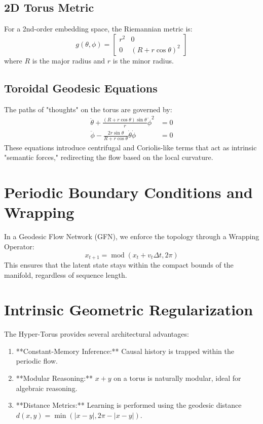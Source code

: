 \documentclass[11pt,a4paper]{report}
\begin{document}
\subsection{2D Torus Metric}
For a 2nd-order embedding space, the Riemannian metric is:
\begin{equation}
    g(\theta, \phi) = \begin{bmatrix} r^2 & 0 \\ 0 & (R + r\cos\theta)^2 \end{bmatrix}
\end{equation}
where $R$ is the major radius and $r$ is the minor radius.

\subsection{Toroidal Geodesic Equations}
The paths of "thoughts" on the torus are governed by:
\begin{align}
    \ddot{\theta} + \frac{(R+r\cos\theta)\sin\theta}{r} \dot{\phi}^2 &= 0 \\
    \ddot{\phi} - \frac{2r\sin\theta}{R+r\cos\theta} \dot{\theta}\dot{\phi} &= 0
\end{align}
These equations introduce centrifugal and Coriolis-like terms that act as intrinsic "semantic forces," redirecting the flow based on the local curvature.

\section{Periodic Boundary Conditions and Wrapping}
In a Geodesic Flow Network (GFN), we enforce the topology through a Wrapping Operator:
\begin{equation}
    x_{t+1} = \operatorname{mod}(x_t + v_t \Delta t, 2\pi)
\end{equation}
This ensures that the latent state stays within the compact bounds of the manifold, regardless of sequence length.

\section{Intrinsic Geometric Regularization}
The Hyper-Torus provides several architectural advantages:
\begin{enumerate}
    \item **Constant-Memory Inference:** Causal history is trapped within the periodic flow.
    \item **Modular Reasoning:** $x + y$ on a torus is naturally modular, ideal for algebraic reasoning.
    \item **Distance Metrics:** Learning is performed using the geodesic distance $d(x, y) = \min(|x-y|, 2\pi - |x-y|)$.
\end{enumerate}
\end{document}
